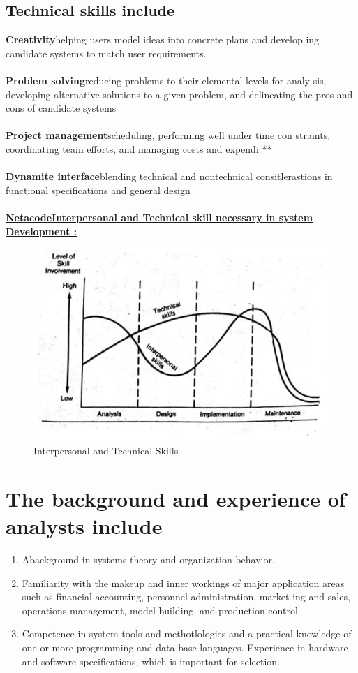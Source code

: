 \documentclass[a4paper,12pt]{report}
\begin{document}
\subsection{Technical skills include}
\textbf{Creativity}helping users model ideas into concrete plans and develop ing candidate systems to match user requirements.\\ \\
\textbf{Problem solving}reducing problems to their elemental levels for analy sis, developing alternative solutions to a given problem, and delineating the pros and cons of candidate systems\\ \\
\textbf{Project management}scheduling, performing well under time con straints, coordinating teain efforts, and managing costs and expendi **\\ \\
\textbf{Dynamite interface}blending technical and nontechnical consitlerastions in functional specifications and general design\\ \\
\underline{\textbf{NetacodeInterpersonal and Technical skill necessary in system Development :}}

\begin{figure}[h]
	\centering
	\includegraphics[width=0.9\linewidth]{3_1}
	\caption{Interpersonal and Technical Skills}
	\label{fig:31}
\end{figure}
\section{The background and experience of analysts include}
\begin{enumerate}
	\item Abackground in systems theory and organization behavior. 
	\item  Familiarity with the makeup and inner workings of major application areas such as financial accounting, personnel administration, market ing and sales, operations management, model building, and production control.
	\item  Competence in system tools and methotlologies and a practical knowledge of one or more programming and data base languages. Experience in hardware and software specifications, which is important for selection.
\end{enumerate}
\end{document}
